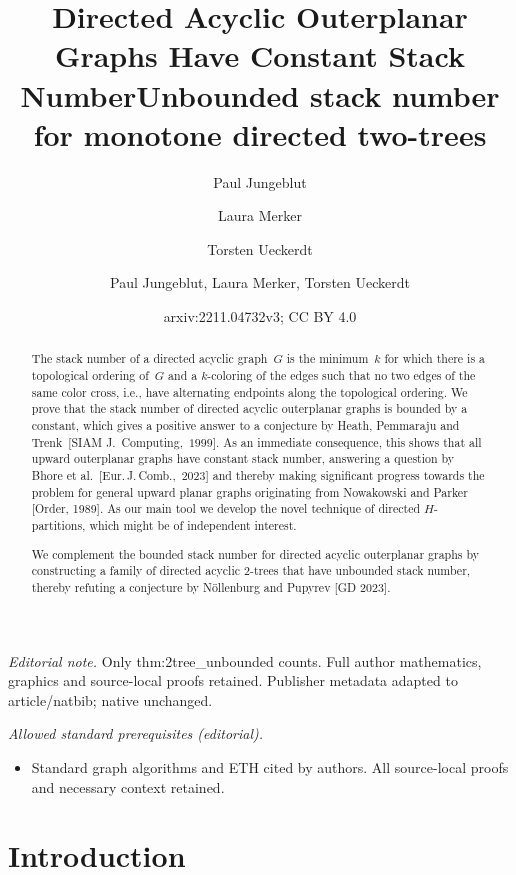 \documentclass{article}
\author{Paul Jungeblut \and Laura Merker \and Torsten Ueckerdt}\date{}
\title{Directed Acyclic Outerplanar Graphs Have Constant Stack Number}
\title{Unbounded stack number for monotone directed two-trees}
\author{Paul Jungeblut, Laura Merker, Torsten Ueckerdt}
\date{arxiv:2211.04732v3; CC BY 4.0}
\begin{document}
\maketitle
\noindent\textit{Editorial note.} Only thm:2tree\_unbounded counts. Full author mathematics, graphics and source-local proofs retained. Publisher metadata adapted to article/natbib; native unchanged.\par\medskip
\noindent\textit{Allowed standard prerequisites (editorial).}\begin{itemize}
\item Standard graph algorithms and ETH cited by authors. All source-local proofs and necessary context retained.
\end{itemize}\medskip

\maketitle

\begin{abstract}
    The stack number of a directed acyclic graph~$G$ is the minimum~$k$ for which there is a topological ordering of~$G$ and a $k$-coloring of the edges such that no two edges of the same color cross, i.e., have alternating endpoints along the topological ordering.
    We prove that the stack number of directed acyclic outerplanar graphs
    is bounded by a constant, which gives a positive answer to a conjecture by Heath, Pemmaraju and Trenk~[SIAM J.\ Computing,~$1999$].
    As an immediate consequence, this shows that all upward outerplanar graphs have constant stack number, answering a question by Bhore et al.~[Eur.\,J.\,Comb.,~2023] and thereby making significant progress towards the problem for general upward planar graphs originating from Nowakowski and Parker [Order, 1989]. 
    As our main tool we develop the novel technique of directed $H$-partitions, which might be of independent interest.

    We complement the bounded stack number for directed acyclic outerplanar graphs by constructing a family of directed acyclic $2$-trees that have unbounded stack number, 
    thereby refuting a conjecture by Nöllenburg and Pupyrev [GD 2023].
\end{abstract}


\section{Introduction}
\end{document}
